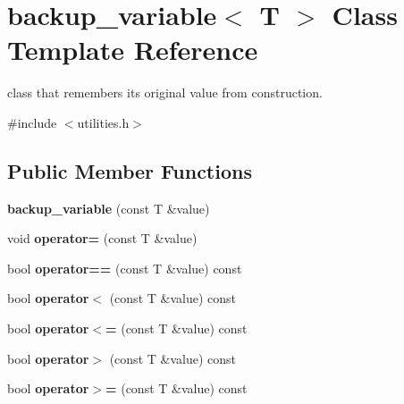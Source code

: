 \hypertarget{classbackup__variable}{\section{backup\-\_\-variable$<$ T $>$ Class Template Reference}
\label{classbackup__variable}
}


class that remembers its original value from construction.  




{\ttfamily \#include $<$utilities.\-h$>$}

\subsection*{Public Member Functions}
\begin{DoxyCompactItemize}
\item 
\hypertarget{classbackup__variable_a5ffb4ce0ce0f679135ce70d8683a9182}{{\bfseries backup\-\_\-variable} (const T \&value)}\label{classbackup__variable_a5ffb4ce0ce0f679135ce70d8683a9182}

\item 
\hypertarget{classbackup__variable_ae4c8c3147d8a341eb268f7b2332098d6}{void {\bfseries operator=} (const T \&value)}\label{classbackup__variable_ae4c8c3147d8a341eb268f7b2332098d6}

\item 
\hypertarget{classbackup__variable_aec3207431e35f74efa6fe2af77ec734d}{bool {\bfseries operator==} (const T \&value) const }\label{classbackup__variable_aec3207431e35f74efa6fe2af77ec734d}

\item 
\hypertarget{classbackup__variable_af6d27d4c48c46816a5f82343609b24db}{bool {\bfseries operator$<$} (const T \&value) const }\label{classbackup__variable_af6d27d4c48c46816a5f82343609b24db}

\item 
\hypertarget{classbackup__variable_a60de5d54f02e5d862ae851ab773830db}{bool {\bfseries operator$<$=} (const T \&value) const }\label{classbackup__variable_a60de5d54f02e5d862ae851ab773830db}

\item 
\hypertarget{classbackup__variable_a1956d30f9a5124527ac9d52821ce9d72}{bool {\bfseries operator$>$} (const T \&value) const }\label{classbackup__variable_a1956d30f9a5124527ac9d52821ce9d72}

\item 
\hypertarget{classbackup__variable_a0b749c6e3c84c43d094d1ba50d1a2323}{bool {\bfseries operator$>$=} (const T \&value) const }\label{classbackup__variable_a0b749c6e3c84c43d094d1ba50d1a2323}


\end{DoxyCompactItemize}
